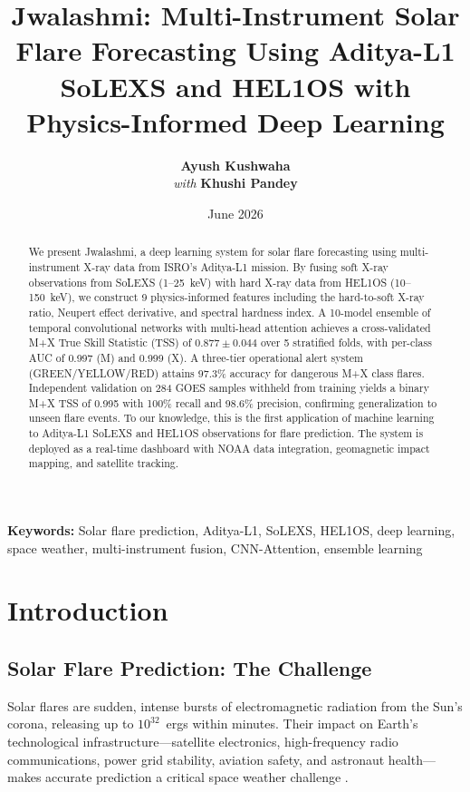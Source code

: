 \documentclass[twocolumn,10pt]{article}
\title{\textbf{Jwalashmi: Multi-Instrument Solar Flare Forecasting Using Aditya-L1 SoLEXS and HEL1OS with Physics-Informed Deep Learning}}
\author{\textbf{Ayush Kushwaha} \\[4pt] \textit{with} \textbf{Khushi Pandey}}
\date{June 2026}
\begin{document}
\maketitle

\begin{abstract}
We present Jwalashmi, a deep learning system for solar flare forecasting using multi-instrument X-ray data from ISRO's Aditya-L1 mission. By fusing soft X-ray observations from SoLEXS (1--25~keV) with hard X-ray data from HEL1OS (10--150~keV), we construct 9 physics-informed features including the hard-to-soft X-ray ratio, Neupert effect derivative, and spectral hardness index. A 10-model ensemble of temporal convolutional networks with multi-head attention achieves a cross-validated M+X True Skill Statistic (TSS) of $0.877 \pm 0.044$ over 5 stratified folds, with per-class AUC of 0.997 (M) and 0.999 (X). A three-tier operational alert system (GREEN/YELLOW/RED) attains 97.3\% accuracy for dangerous M+X class flares. Independent validation on 284 GOES samples withheld from training yields a binary M+X TSS of 0.995 with 100\% recall and 98.6\% precision, confirming generalization to unseen flare events. To our knowledge, this is the first application of machine learning to Aditya-L1 SoLEXS and HEL1OS observations for flare prediction. The system is deployed as a real-time dashboard with NOAA data integration, geomagnetic impact mapping, and satellite tracking.
\end{abstract}

\textbf{Keywords:} Solar flare prediction, Aditya-L1, SoLEXS, HEL1OS, deep learning, space weather, multi-instrument fusion, CNN-Attention, ensemble learning


\section{Introduction}\label{sec:intro}

\subsection{Solar Flare Prediction: The Challenge}\label{sec:challenge}

Solar flares are sudden, intense bursts of electromagnetic radiation from the Sun's corona, releasing up to $10^{32}$~ergs within minutes. Their impact on Earth's technological infrastructure---satellite electronics, high-frequency radio communications, power grid stability, aviation safety, and astronaut health---makes accurate prediction a critical space weather challenge \citep{schrijver2015}.
\end{document}
